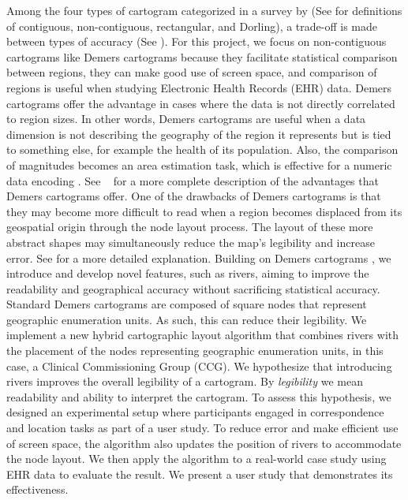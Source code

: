 \documentclass[Afour,sagev,times]{sagej}
\newcommand{\citea}[1]{\citeauthor{#1}~\cite{#1}}
\begin{document}
Among the four types of cartogram categorized in a survey by \citet{nusrat2016State} (See  for definitions of contiguous, non-contiguous, rectangular, and Dorling), a trade-off is made between types of accuracy (See ).
For this project, we focus on non-contiguous cartograms like Demers cartograms because they facilitate statistical comparison between regions, they can make good use of screen space, and comparison of regions is useful when studying Electronic Health Records (EHR) data.
Demers cartograms offer the advantage in cases where the data is not directly correlated to region sizes.
In other words, Demers cartograms are useful when a data dimension is not describing the geography of the region it represents but is tied to something else, for example the health of its population.
Also, the comparison of magnitudes becomes an area estimation task, which is effective for a numeric data encoding \cite{munzner2014Visualization}.
See \citea{nickel2022Multicriteria} for a more complete description of the advantages that Demers cartograms offer.
One of the drawbacks of Demers cartograms is that they may become more difficult to read when a region becomes displaced from its geospatial origin through the node layout process.
The layout of these more abstract shapes may simultaneously reduce the map's legibility and increase error.
See \citet{tong2018Cartograms} for a more detailed explanation.
Building on Demers cartograms \cite{ian2002Cartogram}, we introduce and develop novel features, such as rivers, aiming to improve the readability and geographical accuracy without sacrificing statistical accuracy.
Standard Demers cartograms are composed of square nodes that represent geographic enumeration units.
As such, this can reduce their legibility.
We implement a new hybrid cartographic layout algorithm that combines rivers with the placement of the nodes representing geographic enumeration units, in this case, a Clinical Commissioning Group (CCG).
We hypothesize that introducing rivers improves the overall legibility of a cartogram.
By \textit{legibility} we mean readability and ability to interpret the cartogram.
To assess this hypothesis, we designed an experimental setup where participants engaged in correspondence and location tasks as part of a user study.
To reduce error and make efficient use of screen space, the algorithm also updates the position of rivers to accommodate the node layout.
We then apply the algorithm to a real-world case study using EHR data to evaluate the result.
We present a user study that demonstrates its effectiveness.
\end{document}
